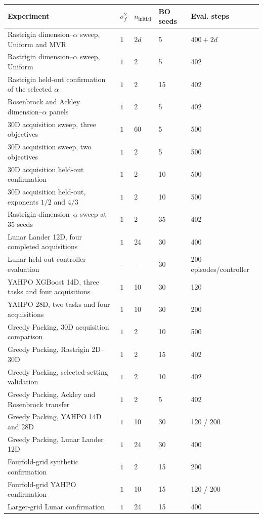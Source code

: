 \begin{tabular}{@{}p{}llll@{}}
\toprule
Experiment & $\sigma_f^2$ & $n_{\mathrm{initial}}$ & BO seeds & Eval. steps \\
\midrule
Rastrigin dimension--$\alpha$ sweep, Uniform and MVR & $1$ & $2d$ & 5 & $400+2d$ \\
Rastrigin dimension--$\alpha$ sweep, Uniform & $1$ & 2 & 5 & 402 \\
Rastrigin held-out confirmation of the selected $\alpha$ & $1$ & 2 & 15 & 402 \\
Rosenbrock and Ackley dimension--$\alpha$ panels & $1$ & 2 & 5 & 402 \\
30D acquisition sweep, three objectives & $1$ & 60 & 5 & 500 \\
30D acquisition sweep, two objectives & $1$ & 2 & 5 & 500 \\
30D acquisition held-out confirmation & $1$ & 2 & 10 & 500 \\
30D acquisition held-out, exponents $1/2$ and $4/3$ & $1$ & 2 & 10 & 500 \\
Rastrigin dimension--$\alpha$ sweep at 35 seeds & $1$ & 2 & 35 & 402 \\
Lunar Lander 12D, four completed acquisitions & $1$ & 24 & 30 & 400 \\
Lunar held-out controller evaluation & -- & -- & 30 & 200 episodes/controller \\
YAHPO XGBoost 14D, three tasks and four acquisitions & $1$ & 10 & 30 & 120 \\
YAHPO 28D, two tasks and four acquisitions & $1$ & 10 & 30 & 200 \\
Greedy Packing, 30D acquisition comparison & $1$ & 2 & 10 & 500 \\
Greedy Packing, Rastrigin 2D--30D & $1$ & 2 & 15 & 402 \\
Greedy Packing, selected-setting validation & $1$ & 2 & 10 & 402 \\
Greedy Packing, Ackley and Rosenbrock transfer & $1$ & 2 & 5 & 402 \\
Greedy Packing, YAHPO 14D and 28D & $1$ & 10 & 30 & 120 / 200 \\
Greedy Packing, Lunar Lander 12D & $1$ & 24 & 30 & 400 \\
Fourfold-grid synthetic confirmation & $1$ & 2 & 15 & 200 \\
Fourfold-grid YAHPO confirmation & $1$ & 10 & 15 & 120 / 200 \\
Larger-grid Lunar confirmation & $1$ & 24 & 15 & 400 \\
\bottomrule
\end{tabular}
